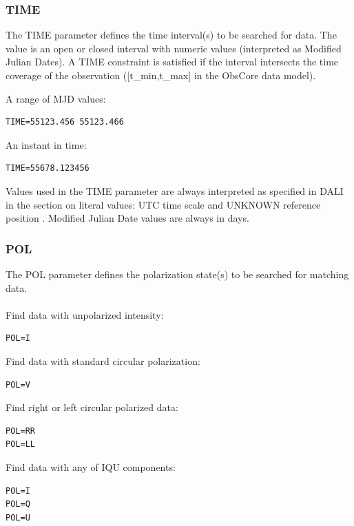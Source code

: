 \documentclass[11pt,a4paper]{ivoa}
\begin{document}
\subsubsection{TIME}
\label{sec:TIME}

The TIME parameter defines the time interval(s) to be searched for data. The value is an open or closed interval with numeric values (interpreted as Modified Julian Dates). A TIME constraint is satisfied if the interval intersects the time coverage of the observation ([t\_min,t\_max] in the ObsCore data model).

A range of MJD values:

\begin{lstlisting}
TIME=55123.456 55123.466
\end{lstlisting}

An instant in time:

\begin{lstlisting}
TIME=55678.123456
\end{lstlisting}

Values used in the TIME parameter are always interpreted as specified in DALI in the section on literal values: UTC time scale and UNKNOWN reference position \citep{std:STC}. Modified Julian Date values are always in days.

\subsubsection{POL}
\label{sec:POL}

The POL parameter defines the polarization state(s) to be searched  for matching data.  \\ \\
Find data with unpolarized intensity:

\begin{lstlisting}
POL=I
\end{lstlisting}
Find data with standard circular polarization:

\begin{lstlisting}
POL=V
\end{lstlisting}
Find  right or left circular polarized data:

\begin{lstlisting}
POL=RR
POL=LL
\end{lstlisting}
Find data with any of IQU components:

\begin{lstlisting}
POL=I
POL=Q
POL=U
\end{lstlisting}
\end{document}

